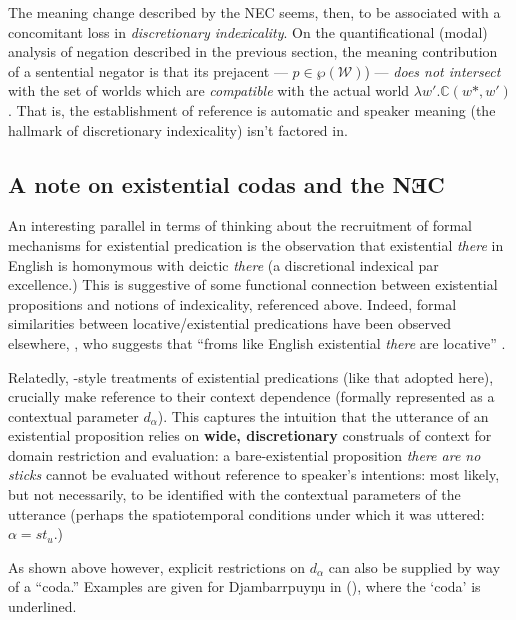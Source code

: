 The meaning change described by the NEC seems, then, to be associated with a concomitant loss in \textit{discretionary indexicality}. On the quantificational (modal) analysis of negation described in the previous section, the meaning contribution of a sentential negator is that its prejacent --- $ p\in\wp(\mathcal W) $) --- \textit{does not intersect} with the set of worlds which are \textit{compatible} with the actual world $ \lambda w'.\mathbb C(w\!*,w') $. That is, the establishment of reference is automatic and speaker meaning (the hallmark of discretionary indexicality) isn't factored in.


\label{disc-nec}
\subsection{A note on existential codas and the NƎC}

\label{codas}

An interesting parallel in terms of thinking about the recruitment of formal mechanisms for existential predication is the observation that existential \textit{there} in English is homonymous with deictic \textit{there} (a discretional indexical par excellence.) This is suggestive of some functional connection between existential propositions and notions of indexicality, referenced above. Indeed, formal similarities between locative/existential predications have been observed elsewhere, \citeauthor[\textit{e.g.,}][]{Freeze1992}, who suggests that ``froms like English existential \textit{there} are locative'' \citeyearpar[554]{Freeze1992}.

Relatedly, \citealt{Francez2007}-style treatments of existential predications (like that adopted here), crucially make reference to their context dependence (formally represented as a contextual parameter $d_\alpha$). This captures the intuition that the utterance of an existential proposition relies on \textbf{wide, discretionary} construals of context for domain restriction and evaluation: a bare-existential proposition \textit{there are no sticks} cannot be evaluated without reference to speaker's intentions: most likely, but not necessarily,  to be identified with the contextual parameters of the utterance (perhaps the spatiotemporal conditions under which it was uttered: $ \alpha=\mathit{st_u} $.)

As shown above however, explicit restrictions on $d_\alpha$ can also be supplied by way of a ``coda.'' Examples are given for Djambarrpuyŋu in (\nextx), where the `coda' is underlined.

